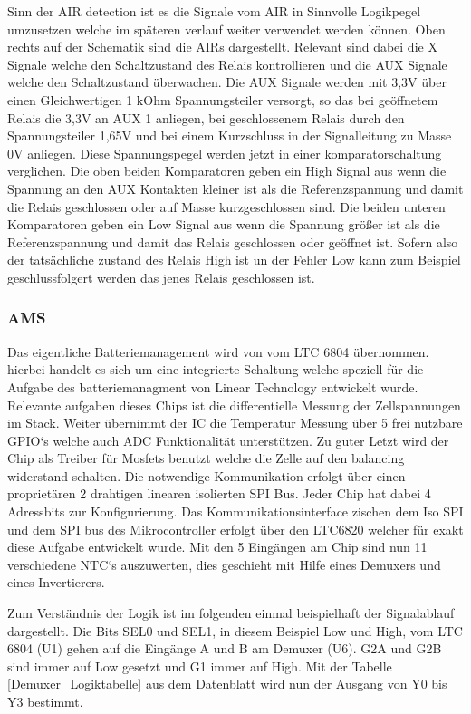 Sinn der AIR detection ist es die Signale vom AIR in Sinnvolle Logikpegel umzusetzen welche im späteren verlauf weiter verwendet werden können. Oben rechts auf der Schematik sind die AIRs dargestellt. Relevant sind dabei die X Signale welche den Schaltzustand des Relais kontrollieren und die AUX Signale welche den Schaltzustand überwachen. Die AUX Signale werden mit 3,3V über einen Gleichwertigen 1 kOhm Spannungsteiler versorgt, so das bei geöffnetem Relais die 3,3V an AUX 1 anliegen, bei geschlossenem Relais durch den Spannungsteiler 1,65V und bei einem Kurzschluss in der Signalleitung zu Masse 0V anliegen. Diese Spannungspegel werden jetzt in einer komparatorschaltung verglichen. Die oben beiden Komparatoren geben ein High Signal aus wenn die Spannung an den AUX Kontakten kleiner ist als die Referenzspannung und damit die Relais geschlossen oder auf Masse kurzgeschlossen sind. Die beiden unteren Komparatoren geben ein Low Signal aus wenn die Spannung größer ist als die Referenzspannung und damit das Relais geschlossen oder geöffnet ist. Sofern also der tatsächliche zustand des Relais High ist un der Fehler Low kann zum Beispiel geschlussfolgert werden das jenes Relais geschlossen ist.
\FloatBarrier
\subsubsection{AMS}
Das eigentliche Batteriemanagement wird von vom LTC 6804 übernommen. hierbei handelt es sich um eine integrierte Schaltung welche speziell für die Aufgabe des batteriemanagment von Linear Technology entwickelt wurde. Relevante aufgaben dieses Chips ist die differentielle Messung der Zellspannungen im Stack. Weiter übernimmt der IC die Temperatur Messung über 5 frei nutzbare GPIO`s welche auch ADC Funktionalität unterstützen. Zu guter Letzt wird der Chip als Treiber für Mosfets benutzt welche die Zelle auf den balancing widerstand schalten. Die notwendige Kommunikation erfolgt über einen proprietären 2 drahtigen linearen isolierten SPI Bus. Jeder Chip hat dabei 4 Adressbits zur Konfigurierung. Das Kommunikationsinterface zischen dem Iso SPI und dem SPI bus des Mikrocontroller erfolgt über den LTC6820 welcher für exakt diese Aufgabe entwickelt wurde. Mit den 5 Eingängen am Chip sind nun 11 verschiedene NTC`s auszuwerten, dies geschieht mit Hilfe eines Demuxers und eines Invertierers.

Zum Verständnis der Logik ist im folgenden einmal beispielhaft der Signalablauf dargestellt.
Die Bits SEL0 und SEL1, in diesem Beispiel Low und High, vom LTC 6804 (U1) gehen auf die Eingänge A und B am Demuxer (U6). G2A und G2B sind immer auf Low gesetzt und G1 immer auf High. Mit der Tabelle \ref{Demuxer_Logiktabelle} aus dem Datenblatt wird nun der Ausgang von Y0 bis Y3 bestimmt.

